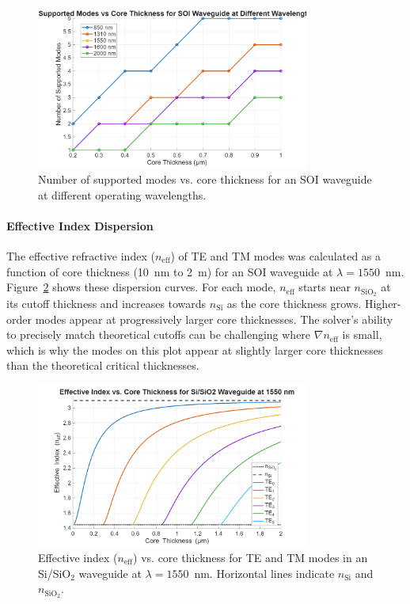 \documentclass[10pt, a4paper]{article}
\begin{document}
\begin{figure}[h!]
    \centering
    \includegraphics[width=0.8\textwidth]{task1/modes_vs_thickness_SOI_wavelengths.png}
    \caption{Number of supported modes vs. core thickness for an SOI waveguide at different operating wavelengths.}
    \label{fig:modes_vs_thickness_SOI_wavelengths}
\end{figure}

\paragraph{Effective Index Dispersion}
The effective refractive index ($n_{\text{eff}}$) of TE and TM modes was calculated as a function of core thickness (10~nm to 2~{\textmu}m) for an SOI waveguide at $\lambda = 1550$~nm. Figure~\ref{fig:neff_vs_thickness_Si_SiO2_1550nm} shows these dispersion curves. For each mode, $n_{\text{eff}}$ starts near $n_{\text{SiO}_2}$ at its cutoff thickness and increases towards $n_{\text{Si}}$ as the core thickness grows. Higher-order modes appear at progressively larger core thicknesses. The solver's ability to precisely match theoretical cutoffs can be challenging where $\nabla n_{\text{eff}}$ is small, which is why the modes on this plot appear at slightly larger core thicknesses than the theoretical critical thicknesses.

\begin{figure}[h!]
    \centering
    \includegraphics[width=0.8\textwidth]{task1/neff_vs_thickness_Si_SiO2_1550nm.png}
    \caption{Effective index ($n_{\text{eff}}$) vs. core thickness for TE and TM modes in an Si/SiO$_2$ waveguide at $\lambda = 1550$~nm. Horizontal lines indicate $n_{\text{Si}}$ and $n_{\text{SiO}_2}$.}
    \label{fig:neff_vs_thickness_Si_SiO2_1550nm}
\end{figure}
\end{document}
